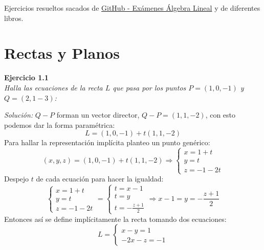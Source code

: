 \documentclass{article}
\newenvironment{problem}[2][Ejercicio]
    { \begin{mdframed}[backgroundcolor=gray!20] \textbf{#1 #2} \\}
    {  \end{mdframed}}
\newenvironment{solution}
    {\textit{Solución:}}
    {}
\begin{document}
\begin{mdframed}[backgroundcolor=blue!20]
Ejercicios resueltos sacados de \href{https://github.com/ExamenesViejos-FaMAF-Computacion/ExamenesViejos_Algebra_FaMAF}{GitHub - Exámenes Álgebra Lineal} y de diferentes libros.
\end{mdframed}

\section{Rectas y Planos}\label{sec:rectas-y-planos}

\begin{problem}{1.1}
    \emph{Halla las ecuaciones de la recta $L$ que pasa por los puntos $P = (1,0,-1)$ y $Q = (2,1-3)$:}
    \end{problem}
    \begin{solution}
    $Q-P$ forman un vector director, $Q-P = (1,1,-2)$, con esto podemos dar la forma paramétrica:
    \[
    L = (1,0,-1) + t(1,1,-2)
    \]
    Para hallar la representación implícita planteo un punto genérico:
    \[
    (x,y,z) = (1,0,-1) + t(1,1,-2) \Rightarrow 
    \begin{cases}
    x = 1 + t \\
    y = t \\
    z = -1-2t
    \end{cases}
    \]
    Despejo $t$ de cada ecuación para hacer la igualdad:
    \[
    \begin{cases}
    x = 1 + t \\
    y = t \\
    z = -1-2t
    \end{cases} =
    \begin{cases}
    t = x-1 \\
    t = y \\
    t = -\frac{z+1}{2}
    \end{cases} \Rightarrow
    x-1 = y = -\frac{z+1}{2}
    \]
    Entonces así se define implícitamente la recta tomando dos ecuaciones:
    \[
    L = 
    \begin{cases}
    x-y = 1 \\
    -2x - z = -1
    \end{cases}
    \]
    \end{solution}
    
\end{document}
